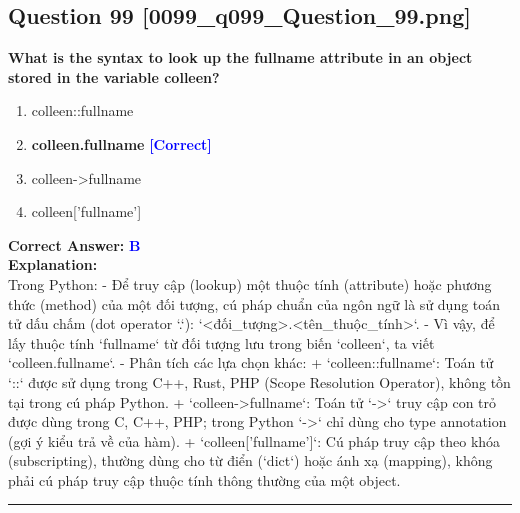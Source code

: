 \documentclass[11pt,a4paper]{article}
\begin{document}
\begin{minipage}{\textwidth}
\subsection*{Question 99 \quad \footnotesize{[0099_q099_Question_99.png]}}
\noindent \textbf{What is the syntax to look up the fullname attribute in an object stored in the variable colleen?}

\begin{enumerate}[label=\Alph*.]
    \item colleen::fullname
    \item \textbf{colleen.fullname} \hfill \textcolor{blue}{\textbf{[Correct]}}
    \item colleen->fullname
    \item colleen['fullname']
\end{enumerate}

\noindent \textbf{Correct Answer:} \textcolor{blue}{\textbf{B}} \\[4pt]
\noindent \textbf{Explanation:}\\
Trong Python:\newline
- Để truy cập (lookup) một thuộc tính (attribute) hoặc phương thức (method) của một đối tượng, cú pháp chuẩn của ngôn ngữ là sử dụng toán tử dấu chấm (dot operator `.`): `<đối_tượng>.<tên_thuộc_tính>`.\newline
- Vì vậy, để lấy thuộc tính `fullname` từ đối tượng lưu trong biến `colleen`, ta viết `colleen.fullname`.\newline
- Phân tích các lựa chọn khác:\newline
  + `colleen::fullname`: Toán tử `::` được sử dụng trong C++, Rust, PHP (Scope Resolution Operator), không tồn tại trong cú pháp Python.\newline
  + `colleen->fullname`: Toán tử `->` truy cập con trỏ được dùng trong C, C++, PHP; trong Python `->` chỉ dùng cho type annotation (gợi ý kiểu trả về của hàm).\newline
  + `colleen['fullname']`: Cú pháp truy cập theo khóa (subscripting), thường dùng cho từ điển (`dict`) hoặc ánh xạ (mapping), không phải cú pháp truy cập thuộc tính thông thường của một object.
\end{minipage}
\vspace{0.8cm}
\hrule
\vspace{0.5cm}
\end{document}
